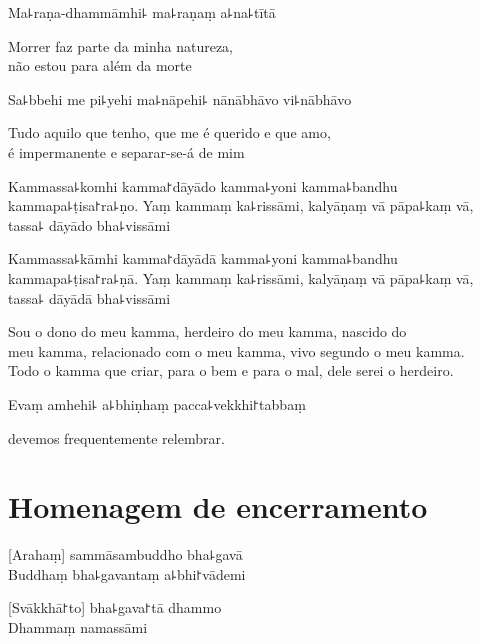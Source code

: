 \documentclass[
  babelLanguage=portuguese,
  final,
  showtrims,
]{chantingbook}
\begin{document}
%
Ma꜕raṇa-dhammāmhi꜕ ma꜕raṇaṃ a꜕na꜕tītā

\begin{english}
  Morrer faz parte da minha natureza,\\
  não estou para além da morte
\end{english}

Sa꜕bbehi me pi꜕yehi ma꜕nāpehi꜕ nānābhāvo vi꜕nābhāvo

\begin{english}
  Tudo aquilo que tenho, que me é querido e que amo,\\
  é impermanente e separar-se-á de mim
\end{english}

\enlargethispage{2\baselineskip}

%
Kammassa꜕komhi kamma꜓dāyādo kamma꜕yoni kamma꜕bandhu kammapa꜕ṭisa꜓ra꜕ṇo. Yaṃ kammaṃ ka꜕rissāmi, kalyāṇaṃ vā pāpa꜕kaṃ vā, tassa꜕ dāyādo bha꜕vissāmi

%
Kammassa꜕kāmhi kamma꜓dāyādā kamma꜕yoni kamma꜕bandhu kammapa꜕ṭisa꜓ra꜕ṇā. Yaṃ kammaṃ ka꜕rissāmi, kalyāṇaṃ vā pāpa꜕kaṃ vā, tassa꜕ dāyādā bha꜕vissāmi

\clearpage

\begin{english}
  Sou o dono do meu kamma, herdeiro do meu kamma, nascido do\\
  meu kamma, relacionado com o meu kamma, vivo segundo o meu kamma.\\
  Todo o kamma que criar, para o bem e para o mal, dele serei o herdeiro.
\end{english}

Evaṃ amhehi꜕ a꜕bhiṇhaṃ pacca꜕vekkhi꜓tabbaṃ

\begin{english}
   devemos frequentemente relembrar.
\end{english}

\artopttrue

\chapter{Homenagem de encerramento}

\delegateSetUseNext

[Arahaṃ] sammāsambuddho bha꜕gavā\\
Buddhaṃ bha꜕gavantaṃ a꜕bhi꜓vādemi

[Svākkhā꜓to] bha꜕gava꜓tā dhammo\\
Dhammaṃ namassāmi
\end{document}
